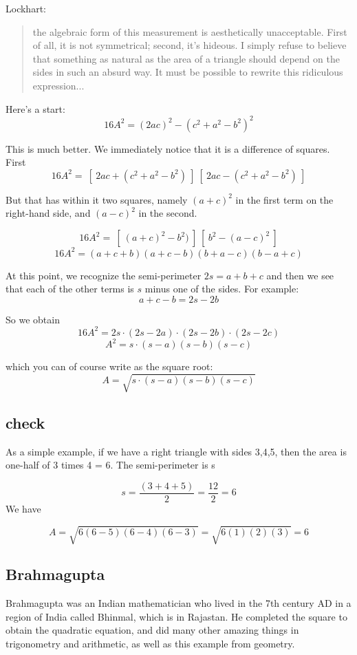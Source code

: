 \documentclass[11pt, oneside]{article}
\begin{document}
Lockhart:

\begin{quote}
the algebraic form of this measurement is aesthetically unacceptable. First of all, it is not symmetrical; second, it's hideous. I simply refuse to believe that something as natural as the area of a triangle should depend on the sides in such an absurd way. It must be possible to rewrite this ridiculous expression...
\end{quote}

Here's a start:
\[ 16A^2 = (2ac)^2 - (c^2 + a^2-b^2)^2 \]

This is much better.  We immediately notice that it is a difference of squares.  First
\[ 16A^2 = \ [ \ 2ac + (c^2 + a^2-b^2) \ ] \ [ \ 2ac - (c^2 + a^2-b^2) \ ]  \]

But that has within it two squares, namely $(a + c)^2$ in the first term on the right-hand side, and $(a - c)^2$ in the second.

\[ 16A^2 = \ [ \ (a + c)^2 -b^2) \ ] \ [ \ b^2 - (a - c)^2 \ ]  \]
\[ 16A^2 =  (a + c + b)(a + c - b)(b + a - c)(b - a + c) \]

At this point, we recognize the semi-perimeter $2s = a + b + c$ and then we see that each of the other terms is $s$ minus one of the sides.  For example:
\[ a + c - b = 2s - 2b \]

So we obtain
\[ 16A^2 = 2s \cdot (2s - 2a) \cdot (2s - 2b) \cdot (2s - 2c) \]
\[ A^2 = s \cdot (s - a)(s - b)(s - c) \]

which you can of course write as the square root:
\[ A = \sqrt{s \cdot (s - a)(s - b)(s - c)} \]


\subsection*{check}
As a simple example, if we have a right triangle with sides 3,4,5, then the area is one-half of 3 times 4 = 6.  The semi-perimeter is s

\[ s = \frac{(3 + 4 + 5)}{2} = \frac{12}{2} = 6 \]
We have

\[ A =  \sqrt { 6 (6-5) (6-4) (6-3) } =  \sqrt { 6 (1) (2) (3) } = 6 \]

\subsection*{Brahmagupta}

Brahmagupta was an Indian mathematician who lived in the 7th century AD in a region of India called Bhinmal, which is in Rajastan.  He completed the square to obtain the quadratic equation, and did many other amazing things in trigonometry and arithmetic, as well as this example from geometry.
\end{document}
